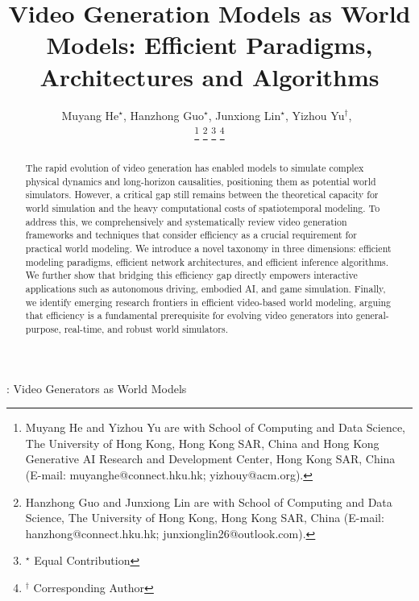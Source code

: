 \documentclass[lettersize,journal]{IEEEtran}
\begin{document}
\title{Video Generation Models as World Models: Efficient Paradigms, Architectures and Algorithms}

\author{Muyang He$^{\star}$, Hanzhong Guo$^{\star}$, Junxiong Lin$^{\star}$, 
Yizhou Yu$^{\dagger}$,~


\thanks{Muyang He and Yizhou Yu are with School of Computing and Data Science, The University of Hong Kong, Hong Kong SAR, China and Hong Kong Generative AI Research and Development Center, Hong Kong SAR, China (E-mail: muyanghe@connect.hku.hk; yizhouy@acm.org).}%
\thanks{Hanzhong Guo and Junxiong Lin are with School of Computing and Data Science, The University of Hong Kong, Hong Kong SAR, China (E-mail: hanzhong@connect.hku.hk; junxionglin26@outlook.com).}
\thanks{$^{\star}$ Equal Contribution}
\thanks{$^{\dagger}$ Corresponding Author}

}


\markboth{}%
{ \MakeLowercase{\textit{}}: Video Generators as World Models}


\maketitle

\begin{abstract}
The rapid evolution of video generation has enabled models to simulate complex physical dynamics and long-horizon causalities, positioning them as potential world simulators. However, a critical gap still remains between the theoretical capacity for world simulation and the heavy computational costs of spatiotemporal modeling. To address this, we comprehensively and systematically review video generation frameworks and techniques that consider efficiency as a crucial requirement for practical world modeling. We introduce a novel taxonomy in three dimensions: efficient modeling paradigms, efficient network architectures, and efficient inference algorithms. We further show that bridging this efficiency gap directly empowers interactive applications such as autonomous driving, embodied AI, and game simulation. Finally, we identify emerging research frontiers in efficient video-based world modeling, arguing that efficiency is a fundamental prerequisite for evolving video generators into general-purpose, real-time, and robust world simulators.
\end{abstract}
\end{document}
